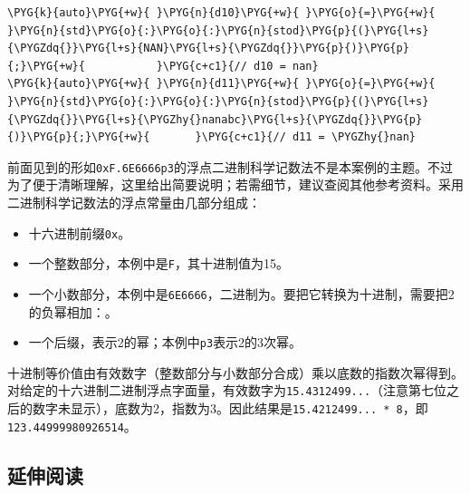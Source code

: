 \begin{codeblockbg}
\begin{Verbatim}[commandchars=\\\{\},breaklines=true,breakanywhere=true,fontsize=\codefont,xleftmargin=17bp]
\PYG{k}{auto}\PYG{+w}{ }\PYG{n}{d10}\PYG{+w}{ }\PYG{o}{=}\PYG{+w}{ }\PYG{n}{std}\PYG{o}{:}\PYG{o}{:}\PYG{n}{stod}\PYG{p}{(}\PYG{l+s}{\PYGZdq{}}\PYG{l+s}{NAN}\PYG{l+s}{\PYGZdq{}}\PYG{p}{)}\PYG{p}{;}\PYG{+w}{           }\PYG{c+c1}{// d10 = nan}
\PYG{k}{auto}\PYG{+w}{ }\PYG{n}{d11}\PYG{+w}{ }\PYG{o}{=}\PYG{+w}{ }\PYG{n}{std}\PYG{o}{:}\PYG{o}{:}\PYG{n}{stod}\PYG{p}{(}\PYG{l+s}{\PYGZdq{}}\PYG{l+s}{\PYGZhy{}nanabc}\PYG{l+s}{\PYGZdq{}}\PYG{p}{)}\PYG{p}{;}\PYG{+w}{       }\PYG{c+c1}{// d11 = \PYGZhy{}nan}
\end{Verbatim}
\end{codeblockbg}



前面见到的形如\texttt{0xF.\allowbreak{}6E6666p3}的浮点二进制科学记数法不是本案例的主题。不过为了便于清晰理解，这里给出简要说明；若需细节，建议查阅其他参考资料。采用二进制科学记数法的浮点常量由几部分组成：



\begin{itemize}
\item 十六进制前缀\texttt{0x}。



\item 一个整数部分，本例中是\texttt{F}，其十进制值为15。



\item 一个小数部分，本例中是\texttt{6E6666}，二进制为。要把它转换为十进制，需要把2的负幂相加：。



\item 一个后缀，表示2的幂；本例中\texttt{p3}表示2的3次幂。

\end{itemize}



十进制等价值由有效数字（整数部分与小数部分合成）乘以底数的指数次幂得到。对给定的十六进制二进制浮点字面量，有效数字为\texttt{15.\allowbreak{}4312499...}（注意第七位之后的数字未显示），底数为2，指数为3。因此结果是\texttt{15.\allowbreak{}4212499... * 8}，即\texttt{123.\allowbreak{}44999980926514}。



\subsection{延伸阅读}


